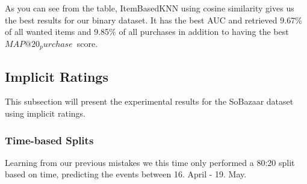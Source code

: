 As you can see from the table, ItemBasedKNN using cosine similarity gives us the best results for our binary dataset. It has the best AUC and retrieved 9.67\% of all wanted items and 9.85\% of all purchases
in addition to having the best $MAP@20_purchase$ score.




\subsection{Implicit Ratings}

This subsection will present the experimental results for the SoBazaar dataset using implicit ratings.


\subsubsection{Time-based Splits}

Learning from our previous mistakes we this time only performed a 80:20 split based on time, predicting the events between 16. April - 19. May.

